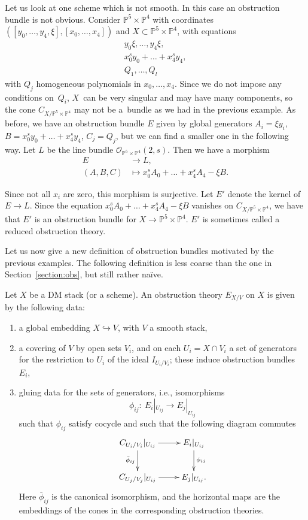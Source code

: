 \documentclass[pdftex]{sigma}
\numberwithin{equation}{section}
\newcommand{\OO}{\mathcal{O}}
\newcommand{\PP}{\mathbb P}
\theoremstyle{plain}
\theoremstyle{definition}
\theoremstyle{remark}
\begin{document}
 \begin{Example}\label{gluecone} Let us look at one scheme which is not smooth. In this case an obstruction bundle is not obvious. Consider $\PP^{5}\times \PP^4$ with coordinates $\left([y_0,\ldots, y_4,\xi],[x_0,\ldots,x_4]\right)$ and $X\subset \PP^5\times\PP^4$, with equations
 \begin{gather*}y_0\xi,\ldots, y_4\xi,\\
 x^s_0y_0+\dots +x^s_4y_4,\\
 Q_1,\ldots,Q_l
 \end{gather*}
 with $Q_j$ homogeneous polynomials in $x_0,\ldots, x_{4}$. Since we do not impose any conditions on~$Q_i$, $X$~can be very singular and may have many components, so the cone $C_{X/\PP^5\times\PP^4}$ may not be a~bundle as we had in the previous example. As before, we have an obstruction bundle $E$ given by global generators $A_i=\xi y_i$, $B=x^s_0y_0+\dots+ x^s_4y_4$, $C_j=Q_j$, but we can find a smaller one in the following way. Let $L$ be the line bundle $\OO_{\PP^5\times\PP^4}(2,s).$ Then we have a morphism
 \begin{align*}
 E&\to L, \\
 (A,B,C)&\mapsto x^s_0A_0+\dots+x^s_4A_4-\xi B.
 \end{align*}

 Since not all $x_i$ are zero, this morphism is surjective. Let $E'$ denote the kernel of $ E\to L$. Since the equation $x^s_0A_0+\dots+x^s_4A_4-\xi B$ vanishes on $C_{X/\PP^5\times\PP^4}$, we have that $E'$ is an obstruction bundle for $X\to \PP^5\times\PP^4$. $E'$ is sometimes called a reduced obstruction theory.
 \end{Example}

 Let us now give a new definition of obstruction bundles motivated by the previous examples. The following definition is less coarse than the one in Section~\ref{section:obs}, but still rather na\"ive.
 \begin{Definition}\label{obs: less coarse}Let $X$ be a DM stack (or a scheme). An obstruction theory $E_{X/V}$ on $X$ is given by the following data:
\begin{enumerate}\itemsep=0pt
\item[1)] a global embedding $X\hookrightarrow V$, with $V$ a smooth stack,
\item[2)] a covering of $V$ by open sets $V_i$, and on each $U_i=X\cap V_i$ a set of generators for the restriction to $U_i$ of the ideal $I_{U_i/V_i}$; these induce obstruction bundles~$E_i$,
\item[3)] gluing data for the sets of generators, i.e., isomorphisms
\[\phi_{ij}\colon \ E_i|_{U_{ij}}\to E_j|_{U_{ij}}
\]
such that $\phi_{ij}$ satisfy cocycle and such that the following diagram commutes
\[\xymatrix{C_{U_i/V_i}|_{U_{ij}}\ar[r]\ar[d]_{\bar{\phi}_{ij}}&E_i|_{U_{ij}}\ar[d]^{\phi_{ij}}\\
C_{U_j/V_j}|_{U_{ij}}\ar[r]&E_j|_{U_{ij}}.}
\]
Here $\bar{\phi}_{ij}$ is the canonical isomorphism, and the horizontal maps are the embeddings of the cones in the corresponding obstruction theories.
\end{enumerate}

 \end{Definition}
\end{document}
